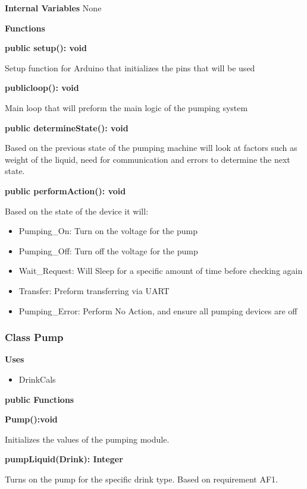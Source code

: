 \documentclass [10pt]{article}
\begin{document}
\textbf{Internal Variables}
None

\textbf{Functions}

\textbf{public setup(): void}

Setup function for Arduino that initializes the pins that will be used 

\textbf{publicloop(): void}

Main loop that will preform the main logic of the pumping system

\textbf{public determineState(): void}

Based on the previous state of the pumping machine will look at factors such as weight of the liquid, need for communication and errors to determine the next state.

\textbf{public performAction(): void}

Based on the state of the device it will:
\begin{itemize}
	
	\item Pumping\_On: Turn on the voltage for the pump
	\item Pumping\_Off: Turn off the voltage for the pump
	
	\item Wait\_Request: Will Sleep for a specific amount of time before checking again
	\item Transfer: Preform transferring via UART
	\item Pumping\_Error: Perform No Action, and ensure all pumping devices are off
\end{itemize}



\subsubsection{Class Pump}

\textbf{Uses}

\begin{itemize}
	\item DrinkCals
\end{itemize}


\textbf{public Functions}

\textbf{Pump():void}

Initializes the values of the pumping module.

\textbf{pumpLiquid(Drink): Integer}

Turns on the pump for the specific drink type. Based on requirement AF1.
\end{document}
